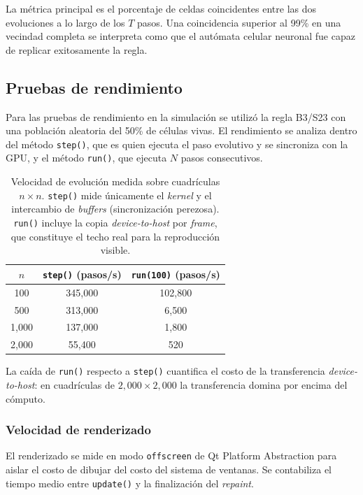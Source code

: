 La métrica principal es el porcentaje de celdas coincidentes entre las dos evoluciones a lo largo de los $T$ pasos. Una coincidencia superior al 99\% en una vecindad completa se interpreta como que el autómata celular neuronal fue capaz de replicar exitosamente la regla.

\subsection{Pruebas de rendimiento}

Para las pruebas de rendimiento en la simulación se utilizó la regla B3/S23 con una población aleatoria del 50\% de células vivas. El rendimiento se analiza dentro del método \texttt{step()}, que es quien ejecuta el paso evolutivo y se sincroniza con la GPU, y el método \texttt{run()}, que ejecuta $N$ pasos consecutivos.

\begin{table}[H]
    \centering
    \begin{tabular}{c|c|c}
        \hline
        $n$ & \texttt{step()} (pasos/s) & \texttt{run(100)} (pasos/s) \\ \hline
        100  & 345,000 & 102,800 \\ \hline
        500  & 313,000 &   6,500 \\ \hline
        1,000 & 137,000 &   1,800 \\ \hline
        2,000 &  55,400 &     520  \\ \hline
    \end{tabular}
    \caption{Velocidad de evolución medida sobre cuadrículas $n \times n$. \texttt{step()} mide únicamente el \textit{kernel} y el intercambio de \textit{buffers} (sincronización perezosa). \texttt{run()} incluye la copia \textit{device-to-host} por \textit{frame}, que constituye el techo real para la reproducción visible.}
    \label{tab:perf-evolucion}
\end{table}

La caída de \texttt{run()} respecto a \texttt{step()} cuantifica el costo de la transferencia \textit{device-to-host}: en cuadrículas de $2{,}000 \times 2{,}000$ la transferencia domina por encima del cómputo.

\subsubsection{Velocidad de renderizado}

El renderizado se mide en modo \texttt{offscreen} de Qt Platform Abstraction para aislar el costo de dibujar del costo del sistema de ventanas. Se contabiliza el tiempo medio entre \texttt{update()} y la finalización del \textit{repaint}.

